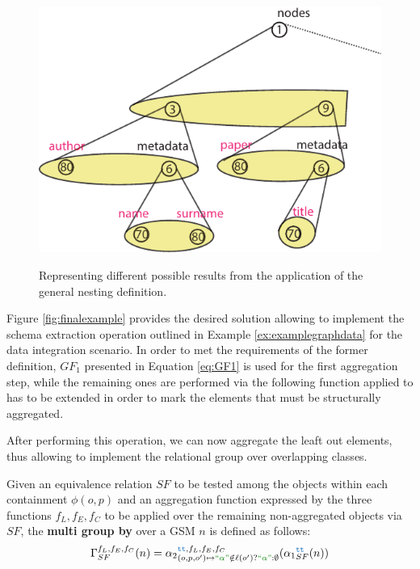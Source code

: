 \begin{figure}[!t]
	\ContinuedFloat
	\centering
	\begin{minipage}[t]{0.5\textwidth}
		\centering
		\includegraphics[scale=0.8]{fig/05language/13actual_schema.pdf}
		\label{fig:finalexample}
	\end{minipage}
	\caption{Representing different possible results from the application of the general nesting definition.}
\end{figure}
\begin{example}[continues=ex:aggregations2]
Figure \vref{fig:finalexample} provides the desired solution allowing to implement the schema extraction operation outlined in Example \vref{ex:examplegraphdata} for the data integration scenario.
In order to met the requirements of the former definition, $GF_1$ presented in Equation \vref{eq:GF1} is used for the first aggregation step, while the remaining ones are performed via the following function applied to has to be extended in order to mark the elements that must be structurally aggregated.
\end{example}

After performing this operation, we can now aggregate the leaft out elements, thus allowing to implement the relational group over overlapping classes.

\begin{definition}
Given an equivalence relation $SF$ to be tested among the objects within each containment $\phi(o,p)$ and an aggregation function expressed by the three functions $f_L,f_E,f_C$ to be applied over the remaining non-aggregated objects via $SF$, the \textbf{multi group by} over a GSM $n$ is defined as follows:
	\[\Gamma_{SF}^{f_L,f_E,f_C}(n)={\alpha_2}_{(o,p,o')\mapsto {\color{webgreen}\textup{``}\alpha\textup{''}}\notin\ell(o')?{\color{webgreen}\textup{``}\alpha\textup{''}}:\emptyset}^{\texttt{\color{RoyalBlue}tt},f_L,f_E,f_C}({\alpha_1}_{SF}^{{\color{RoyalBlue}\texttt{tt}}}(n))\]
\end{definition}

